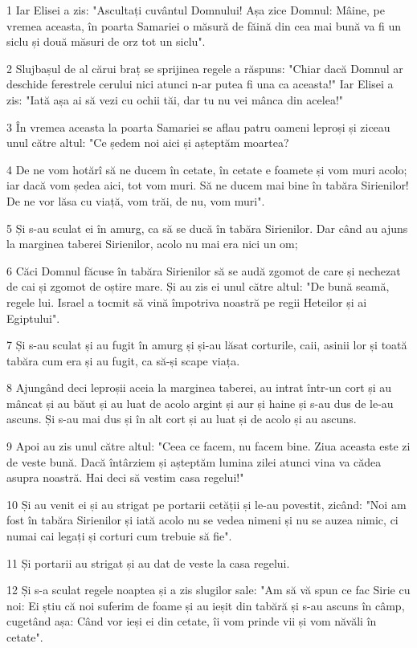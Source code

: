 \par 1 Iar Elisei a zis: "Ascultați cuvântul Domnului! Așa zice Domnul: Mâine, pe vremea aceasta, în poarta Samariei o măsură de făină din cea mai bună va fi un siclu și două măsuri de orz tot un siclu".
\par 2 Slujbașul de al cărui braț se sprijinea regele a răspuns: "Chiar dacă Domnul ar deschide ferestrele cerului nici atunci n-ar putea fi una ca aceasta!" Iar Elisei a zis: "Iată așa ai să vezi cu ochii tăi, dar tu nu vei mânca din acelea!"
\par 3 În vremea aceasta la poarta Samariei se aflau patru oameni leproși și ziceau unul către altul: "Ce ședem noi aici și așteptăm moartea?
\par 4 De ne vom hotărî să ne ducem în cetate, în cetate e foamete și vom muri acolo; iar dacă vom ședea aici, tot vom muri. Să ne ducem mai bine în tabăra Sirienilor! De ne vor lăsa cu viață, vom trăi, de nu, vom muri".
\par 5 Și s-au sculat ei în amurg, ca să se ducă în tabăra Sirienilor. Dar când au ajuns la marginea taberei Sirienilor, acolo nu mai era nici un om;
\par 6 Căci Domnul făcuse în tabăra Sirienilor să se audă zgomot de care și nechezat de cai și zgomot de oștire mare. Și au zis ei unul către altul: "De bună seamă, regele lui. Israel a tocmit să vină împotriva noastră pe regii Heteilor și ai Egiptului".
\par 7 Și s-au sculat și au fugit în amurg și și-au lăsat corturile, caii, asinii lor și toată tabăra cum era și au fugit, ca să-și scape viața.
\par 8 Ajungând deci leproșii aceia la marginea taberei, au intrat într-un cort și au mâncat și au băut și au luat de acolo argint și aur și haine și s-au dus de le-au ascuns. Și s-au mai dus și în alt cort și au luat și de acolo și au ascuns.
\par 9 Apoi au zis unul către altul: "Ceea ce facem, nu facem bine. Ziua aceasta este zi de veste bună. Dacă întârziem și așteptăm lumina zilei atunci vina va cădea asupra noastră. Hai deci să vestim casa regelui!"
\par 10 Și au venit ei și au strigat pe portarii cetății și le-au povestit, zicând: "Noi am fost în tabăra Sirienilor și iată acolo nu se vedea nimeni și nu se auzea nimic, ci numai cai legați și corturi cum trebuie să fie".
\par 11 Și portarii au strigat și au dat de veste la casa regelui.
\par 12 Și s-a sculat regele noaptea și a zis slugilor sale: "Am să vă spun ce fac Sirie cu noi: Ei știu că noi suferim de foame și au ieșit din tabără și s-au ascuns în câmp, cugetând așa: Când vor ieși ei din cetate, îi vom prinde vii și vom năvăli în cetate".

